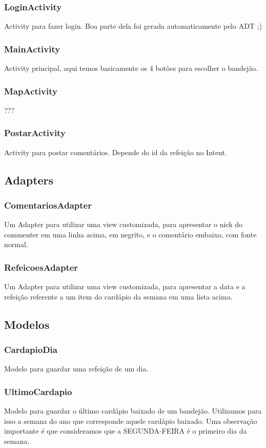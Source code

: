 \subsubsection{LoginActivity}
Activity para fazer login. Boa parte dela foi gerada automaticamente pelo ADT ;)

\subsubsection{MainActivity}
Activity principal, aqui temos basicamente os 4 botões para escolher o bandejão.

\subsubsection{MapActivity}
???

\subsubsection{PostarActivity}
Activity para postar comentários. Depende do id da refeição no Intent.

\subsection{Adapters}
\subsubsection{ComentariosAdapter}
Um Adapter para utilizar uma view customizada, para apresentar o nick do commenter em uma linha acima, em negrito, e o comentário embaixo, com fonte normal.
\subsubsection{RefeicoesAdapter}
Um Adapter para utilizar uma view customizada, para apresentar a data e a refeição referente a um item do cardápio da semana em uma lista acima.

\subsection{Modelos}
\subsubsection{CardapioDia}
Modelo para guardar uma refeição de um dia.

\subsubsection{UltimoCardapio}
Modelo para guardar o último cardápio baixado de um bandejão. Utilizamos para isso a semana do ano que corresponde aquele cardápio baixado. Uma observação importante é que consideramos que a SEGUNDA-FEIRA é o primeiro dia da semana.

